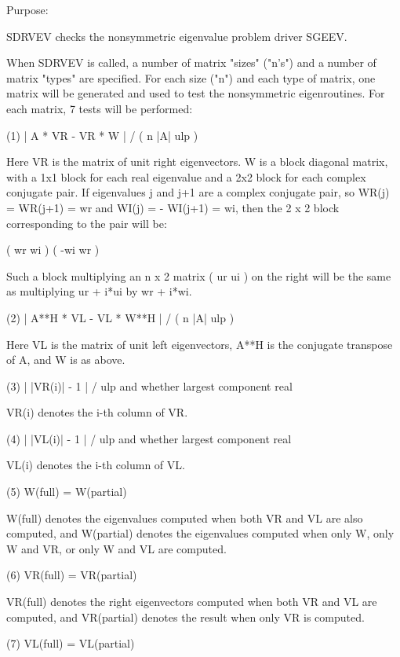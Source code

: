 \begin{DoxyParagraph}{Purpose\+: }
\begin{DoxyVerb}    SDRVEV  checks the nonsymmetric eigenvalue problem driver SGEEV.

    When SDRVEV is called, a number of matrix "sizes" ("n's") and a
    number of matrix "types" are specified.  For each size ("n")
    and each type of matrix, one matrix will be generated and used
    to test the nonsymmetric eigenroutines.  For each matrix, 7
    tests will be performed:

    (1)     | A * VR - VR * W | / ( n |A| ulp )

      Here VR is the matrix of unit right eigenvectors.
      W is a block diagonal matrix, with a 1x1 block for each
      real eigenvalue and a 2x2 block for each complex conjugate
      pair.  If eigenvalues j and j+1 are a complex conjugate pair,
      so WR(j) = WR(j+1) = wr and WI(j) = - WI(j+1) = wi, then the
      2 x 2 block corresponding to the pair will be:

              (  wr  wi  )
              ( -wi  wr  )

      Such a block multiplying an n x 2 matrix  ( ur ui ) on the
      right will be the same as multiplying  ur + i*ui  by  wr + i*wi.

    (2)     | A**H * VL - VL * W**H | / ( n |A| ulp )

      Here VL is the matrix of unit left eigenvectors, A**H is the
      conjugate transpose of A, and W is as above.

    (3)     | |VR(i)| - 1 | / ulp and whether largest component real

      VR(i) denotes the i-th column of VR.

    (4)     | |VL(i)| - 1 | / ulp and whether largest component real

      VL(i) denotes the i-th column of VL.

    (5)     W(full) = W(partial)

      W(full) denotes the eigenvalues computed when both VR and VL
      are also computed, and W(partial) denotes the eigenvalues
      computed when only W, only W and VR, or only W and VL are
      computed.

    (6)     VR(full) = VR(partial)

      VR(full) denotes the right eigenvectors computed when both VR
      and VL are computed, and VR(partial) denotes the result
      when only VR is computed.

     (7)     VL(full) = VL(partial)


\end{DoxyVerb}
\end{DoxyParagraph}
